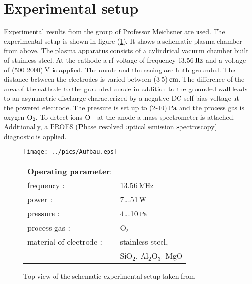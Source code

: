 \section{Experimental setup}
\label{exp}
Experimental results from the group of Professor Meichsner are used. 
The experimental setup is shown in figure (\ref{fig:setup}). 
It shows a schematic plasma chamber from above. 
The plasma apparatus consists of a cylindrical vacuum chamber built of stainless steel.
At the cathode a rf voltage of frequency 13.56$\,\mathrm{Hz}$ and a voltage of (500-2000)$\,\mathrm{V}$ is applied.
The anode and the casing are both grounded.
The distance between the electrodes is varied between (3-5)$\,\mathrm{cm}$.
The difference of the area of the cathode to the grounded anode in addition to the grounded wall leads to an asymmetric discharge characterized by a negative DC self-bias voltage at the powered electrode. 
The pressure is set up to (2-10)$\,\mathrm{Pa}$ and the process gas is oxygen $\rm{O}_2$.
To detect ions $\rm{O}^-$ at the anode a mass spectrometer is attached.
Additionally, a PROES (\textbf{P}hase \textbf{r}esolved \textbf{o}ptical \textbf{e}mission \textbf{s}pectroscopy) diagnostic is applied.\\

\begin{figure}[htbp]
    \begin{minipage}{0.5\textwidth}
       \texttt{[image: ../pics/Aufbau.eps]}
       \caption{Top view of the schematic experimental setup taken from \cite{basti}.}
        \label{fig:setup}
    \end{minipage}
    \begin{minipage}{0.5\textwidth}
            \begin{tabular}{l l}
            \textbf{Operating parameter}: & \\
            frequency : & 13.56$\,\mathrm{MHz}$\\
            power : & 7...51$\,\mathrm{W}$\\
            pressure : & 4...10$\,\mathrm{Pa}$\\
            process gas : & O$_2$\\
                material of electrode : & stainless steel, \\ & SiO$_2$, Al$_2$O$_3$, MgO
            \end{tabular}
    \end{minipage}
\end{figure}

